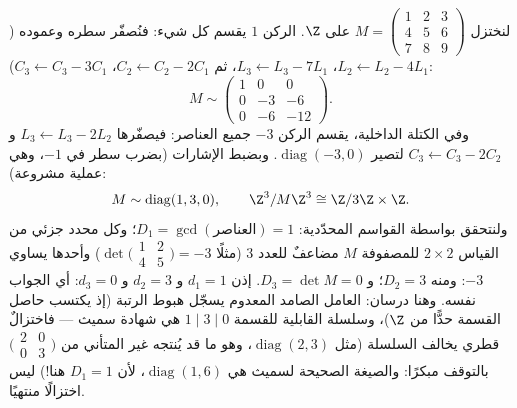 \begin{example}
\label{ex:b3:modules:smithworked}
لنختزل $M = \begin{pmatrix} 1 & 2 & 3\\ 4 & 5 & 6\\ 7 & 8 & 9
\end{pmatrix}$ على $\Z$. الركن $1$ يقسم كل شيء: فنُصفّر سطره
وعموده ($L_2 \leftarrow L_2 - 4L_1$، $L_3
\leftarrow L_3 - 7L_1$، ثم $C_2 \leftarrow C_2 - 2C_1$، $C_3
\leftarrow C_3 - 3C_1$):
\[
M \sim \begin{pmatrix} 1 & 0 & 0\\ 0 & -3 & -6\\ 0 & -6 & -12
\end{pmatrix} .
\]
وفي الكتلة الداخلية، يقسم الركن $-3$ جميع العناصر: فيصفّرها
$L_3
\leftarrow L_3 - 2L_2$ و $C_3 \leftarrow C_3 - 2C_2$ لتصير $\operatorname{diag}(-3, 0)$. وبضبط الإشارات (بضرب سطر في $-1$،
وهي عملية مشروعة):
\[
M \sim \operatorname{diag}(1, 3, 0),
\qquad
\Z^3/M\Z^3 \cong \Z/3\Z \times \Z .
\]
ولنتحقق بواسطة القواسم المحدّدية: $D_1 =
\gcd(\text{العناصر}) = 1$؛ وكل محدد جزئي من
القياس $2\times2$ للمصفوفة $M$ مضاعفٌ للعدد $3$ (مثلًا $\det\bigl(\begin{smallmatrix}1 & 2\\ 4
& 5\end{smallmatrix}\bigr) = -3$)
وأحدها يساوي $-3$: ومنه $D_2 =
3$؛ و $D_3 = \det M = 0$. إذن $d_1 = 1$
و $d_2 = 3$ و $d_3 = 0$: أي الجواب نفسه. وهنا درسان: العامل
الصامد المعدوم يسجّل هبوط الرتبة (إذ يكتسب حاصل القسمة حدًّا 
من $\Z$)، وسلسلة القابلية للقسمة $1 \mid 3 \mid 0$ هي شهادة سميث --- فاختزالٌ
قطري يخالف السلسلة (مثل $\operatorname{diag}(2, 3)$، وهو ما قد يُنتجه غير المتأني من
$\bigl(\begin{smallmatrix}2 & 0\\ 0 &
3\end{smallmatrix}\bigr)$ بالتوقف مبكرًا: والصيغة الصحيحة لسميث هي $\operatorname{diag}(1, 6)$، لأن
$D_1 = 1$ هنا!) ليس اختزالًا منتهيًا.
\end{example}

